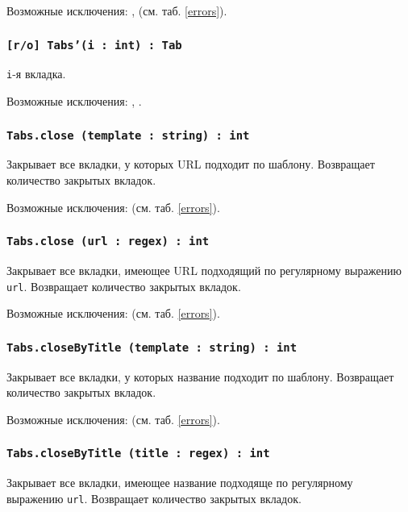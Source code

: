 Возможные исключения: ,  (см. таб. \ref{errors}).

\subsubsection{\texttt{[r/o] Tabs'(i : int) : Tab}}

\texttt{i}-я вкладка.

Возможные исключения: , .

\subsubsection{\texttt{Tabs.close (template : string) : int}}

Закрывает все вкладки, у которых URL подходит по шаблону. Возвращает количество закрытых вкладок.

Возможные исключения:  (см. таб. \ref{errors}).

\subsubsection{\texttt{Tabs.close (url : regex) : int}}

Закрывает все вкладки, имеющее URL подходящий по регулярному выражению \texttt{url}. Возвращает количество закрытых вкладок.

Возможные исключения:  (см. таб. \ref{errors}).

\subsubsection{\texttt{Tabs.closeByTitle (template : string) : int}}

Закрывает все вкладки, у которых название подходит по шаблону. Возвращает количество закрытых вкладок.

Возможные исключения:  (см. таб. \ref{errors}).

\subsubsection{\texttt{Tabs.closeByTitle (title : regex) : int}}

Закрывает все вкладки, имеющее название подходяще по регулярному выражению \texttt{url}. Возвращает количество закрытых вкладок.

